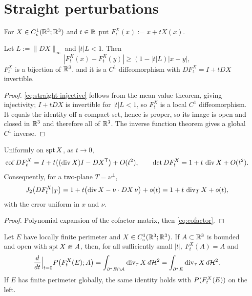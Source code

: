 \section{Straight perturbations}\label{sec:first-variation-formulas}

\begin{definition}\label{def:straight}
For $X\in C^1_c(\mathbb R^3;\mathbb R^3)$ and $t\in\mathbb R$ put $F^X_t(x):=x+tX(x)$.
\end{definition}

\begin{lemma}\label{lem:straight-diffeo}
Let $L:=\|DX\|_\infty$ and $|t|L<1$.  Then
\begin{equation}\label{eq:straight-injective}
  |F^X_t(x)-F^X_t(y)|\ge(1-|t|L)|x-y| ,
\end{equation}
$F^X_t$ is a bijection of $\mathbb R^3$, and it is a $C^1$ diffeomorphism with
$DF^X_t=I+tDX$ invertible.
\end{lemma}

\begin{proof}
\eqref{eq:straight-injective} follows from the mean value theorem, giving
injectivity; $I+tDX$ is invertible for $|t|L<1$, so $F^X_t$ is a local $C^1$
diffeomorphism.  It equals the identity off a compact set, hence is proper,
so its image is open and closed in $\mathbb R^3$ and therefore all of $\mathbb R^3$.  The
inverse function theorem gives a global $C^1$ inverse.
\end{proof}

\begin{lemma}\label{lem:straight-cofactor}
Uniformly on $\operatorname{spt} X$, as $t\to0$,
\[
  \operatorname{cof} DF^X_t
  =I+t\bigl((\operatorname{div} X)I-DX^{\mathsf T}\bigr)+O(t^2),
  \qquad
  \det DF^X_t=1+t\,\operatorname{div} X+O(t^2).
\]
Consequently, for a two-plane $T=\nu^\perp$,
\begin{equation}\label{eq:straight-jacobian}
  J_2\bigl(DF^X_t|_T\bigr)
  =1+t\bigl(\operatorname{div} X-\nu\cdot DX\,\nu\bigr)+o(t)
  =1+t\,\operatorname{div}_TX+o(t),
\end{equation}
with the error uniform in $x$ and $\nu$.
\end{lemma}

\begin{proof}
Polynomial expansion of the cofactor matrix, then \eqref{eq:cofactor}.
\end{proof}

\begin{theorem}\label{thm:first-var-perimeter}
Let $E$ have locally finite perimeter and $X\in C^1_c(\mathbb R^3;\mathbb R^3)$.  If
$A\subset\mathbb R^3$ is bounded and open with $\operatorname{spt} X\Subset A$, then, for all
sufficiently small $|t|$, $F_t^X(A)=A$ and
\begin{equation}\label{eq:first-var-perimeter}
  \frac{d}{dt}\Big|_{t=0}P\bigl(F^X_t(E);A\bigr)
  =\int_{\partial^* E\cap A}\operatorname{div}_\tau X\,d\mathcal H^2
  =\int_{\partial^* E}\operatorname{div}_\tau X\,d\mathcal H^2 .
\end{equation}
If $E$ has finite perimeter globally, the same identity holds with
$P(F_t^X(E))$ on the left.
\end{theorem}

